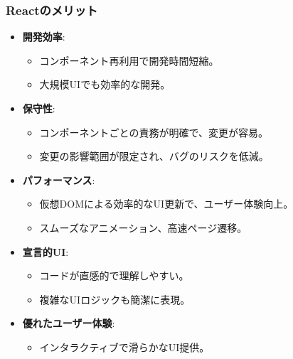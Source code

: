 \documentclass{beamer}
\begin{document}
\begin{frame}
    \frametitle{Reactのメリット}
    \begin{itemize}
        \item \textbf{開発効率}:
            \begin{itemize}
                \item コンポーネント再利用で開発時間短縮。
                \item 大規模UIでも効率的な開発。
            \end{itemize}
        \item \textbf{保守性}:
            \begin{itemize}
                \item コンポーネントごとの責務が明確で、変更が容易。
                \item 変更の影響範囲が限定され、バグのリスクを低減。
            \end{itemize}
        \item \textbf{パフォーマンス}:
            \begin{itemize}
                \item 仮想DOMによる効率的なUI更新で、ユーザー体験向上。
                \item スムーズなアニメーション、高速ページ遷移。
            \end{itemize}
        \item \textbf{宣言的UI}:
            \begin{itemize}
                \item コードが直感的で理解しやすい。
                \item 複雑なUIロジックも簡潔に表現。
            \end{itemize}
        \item \textbf{優れたユーザー体験}:
            \begin{itemize}
                \item インタラクティブで滑らかなUI提供。
            \end{itemize}
    \end{itemize}
\end{frame}
\end{document}
